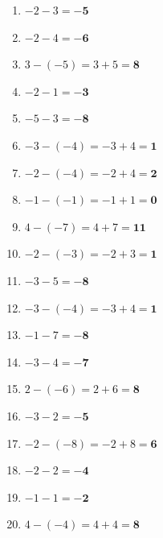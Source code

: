 \documentclass[a4paper,10pt]{article} %
\begin{document}
\begin{enumerate}
  \item \(-2 - 3 =
    \mathbf{-5}\) %

  \item \(-2 - 4 =
    \mathbf{-6}\) %

  \item \(3 - (-5) =
    3 + 5 =
    \mathbf{8}\) %

  \item \(-2 - 1 =
    \mathbf{-3}\) %

  \item \(-5 - 3 =
    \mathbf{-8}\) %

  \item \(-3 - (-4) =
    -3 + 4 =
    \mathbf{1}\) %

  \item \(-2 - (-4) =
    -2 + 4 =
    \mathbf{2}\) %

  \item \(-1 - (-1) =
    -1 + 1 =
    \mathbf{0}\) %

  \item \(4 - (-7) =
    4 + 7 =
    \mathbf{11}\) %

  \item \(-2 - (-3) =
    -2 + 3 =
    \mathbf{1}\) %

  \item \(-3 - 5 =
    \mathbf{-8}\) %

  \item \(-3 - (-4) =
    -3 + 4 =
    \mathbf{1}\) %

  \item \(-1 - 7 =
    \mathbf{-8}\) %

  \item \(-3 - 4 =
    \mathbf{-7}\) %

  \item \(2 - (-6) =
    2 + 6 =
    \mathbf{8}\) %

  \item \(-3 - 2 =
    \mathbf{-5}\) %

  \item \(-2 - (-8) =
    -2 + 8 =
    \mathbf{6}\) %

  \item \(-2 - 2 =
    \mathbf{-4}\) %

  \item \(-1 - 1 =
    \mathbf{-2}\) %

  \item \(4 - (-4) =
    4 + 4 =
    \mathbf{8}\) %


\end{enumerate}
\end{document}
